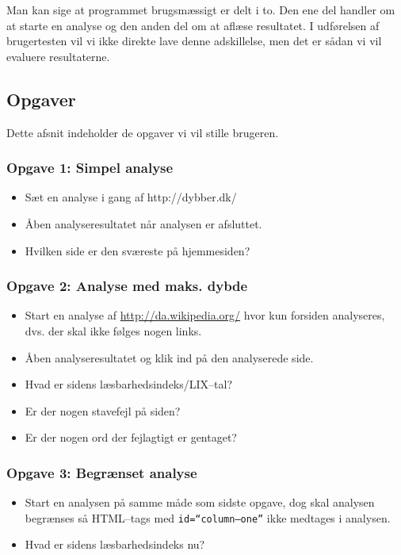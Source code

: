 \documentclass[a4paper,oneside]{memoir}
\begin{document}
Man kan sige at programmet brugsmæssigt er delt i to. Den ene del
handler om at starte en analyse og den anden del om at aflæse
resultatet. I udførelsen af brugertesten vil vi ikke direkte lave
denne adskillelse, men det er sådan vi vil evaluere resultaterne.

\subsection{Opgaver}
Dette afsnit indeholder de opgaver vi vil stille brugeren.

\subsubsection{Opgave 1: Simpel analyse}
\begin{itemize}
\item Sæt en analyse i gang af http://dybber.dk/
\item Åben analyseresultatet når analysen er afsluttet.
\item Hvilken side er den sværeste på hjemmesiden?
\end{itemize}

\subsubsection{Opgave 2: Analyse med maks. dybde}
\begin{itemize}
\item Start en analyse af \url{http://da.wikipedia.org/} hvor kun
  forsiden analyseres, dvs. der skal ikke følges nogen links.
\item Åben analyseresultatet og klik ind på den analyserede side.
\item Hvad er sidens læsbarhedsindeks/LIX--tal?
\item Er der nogen stavefejl på siden?
\item Er der nogen ord der fejlagtigt er gentaget?
\end{itemize}

\subsubsection{Opgave 3: Begrænset analyse}
\begin{itemize}
\item Start en analysen på samme måde som sidste opgave, dog skal
  analysen begrænses så HTML--tags med \texttt{id=``column--one''} ikke
  medtages i analysen.
\item Hvad er sidens læsbarhedsindeks nu?
\end{itemize}
\end{document}
